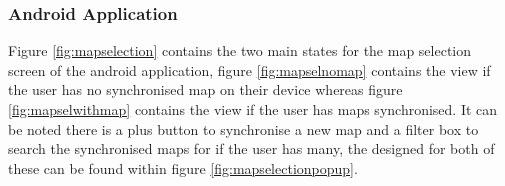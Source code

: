 \subsubsection{Android Application}
Figure \ref{fig:mapselection} contains the two main states for the map selection screen of the android application, figure \ref{fig:mapselnomap} contains the view if the user has no synchronised map on their device whereas figure \ref{fig:mapselwithmap} contains the view if the user has maps synchronised. It can be noted there is a plus button to synchronise a new map and a filter box to search the synchronised maps for if the user has many, the designed for both of these can be found within figure \ref{fig:mapselectionpopup}.\\
\begin{figure}[h]
	\centering
\begin{subfigure}{.5\textwidth}
	\centering

\end{subfigure}
\end{figure}
